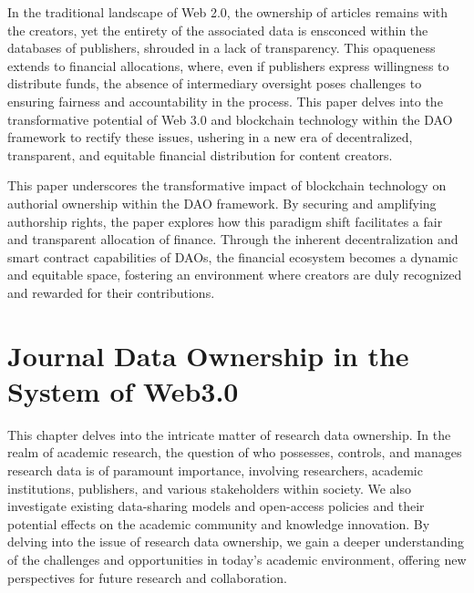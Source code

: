 \documentclass[lettersize,journal]{IEEEtran}
\begin{document}
In the traditional landscape of Web 2.0, the ownership of articles remains with the creators, yet the entirety of the associated data is ensconced within the databases of publishers, shrouded in a lack of transparency. This opaqueness extends to financial allocations, where, even if publishers express willingness to distribute funds, the absence of intermediary oversight poses challenges to ensuring fairness and accountability in the process. This paper delves into the transformative potential of Web 3.0 and blockchain technology within the DAO framework to rectify these issues, ushering in a new era of decentralized, transparent, and equitable financial distribution for content creators.

This paper underscores the transformative impact of blockchain technology on authorial ownership within the DAO framework. By securing and amplifying authorship rights, the paper explores how this paradigm shift facilitates a fair and transparent allocation of finance. Through the inherent decentralization and smart contract capabilities of DAOs, the financial ecosystem becomes a dynamic and equitable space, fostering an environment where creators are duly recognized and rewarded for their contributions.

\section{Journal Data Ownership in the System of Web3.0}

This chapter delves into the intricate matter of research data ownership. In the realm of academic research, the question of who possesses, controls, and manages research data is of paramount importance, involving researchers, academic institutions, publishers, and various stakeholders within society. We also investigate existing data-sharing models and open-access policies and their potential effects on the academic community and knowledge innovation. By delving into the issue of research data ownership, we gain a deeper understanding of the challenges and opportunities in today's academic environment, offering new perspectives for future research and collaboration.
\end{document}
